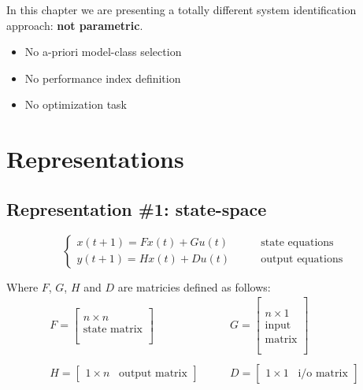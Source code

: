 In this chapter we are presenting a totally different system identification approach: \textbf{not parametric}.
\begin{itemize}
    \item No a-priori model-class selection
    \item No performance index definition
    \item No optimization task
\end{itemize}

\section{Representations}

\subsection{Representation \#1: state-space}

\[
\begin{cases}
    x(t+1) = F x(t) + G u(t) & \qquad \text{state equations} \\
    y(t+1) = H x(t) + D u(t) & \qquad \text{output equations}
\end{cases}
\]

Where $F$, $G$, $H$ and $D$ are matricies defined as follows:
\begin{align*}
    F = \begin{bmatrix}
        \\
        n \times n \\
        \text{state matrix} \\ \\
    \end{bmatrix}
    &
    \qquad
    G = \begin{bmatrix}
        \\
        \\
        n \times 1 \\
        \text{input} \\
        \text{matrix} \\ \\
    \end{bmatrix}
    \\ \\
    H = \begin{bmatrix}
        1 \times n \;\;\; \text{output matrix}
    \end{bmatrix}
    &
    \qquad
    D = \begin{bmatrix}
        1 \times 1 \;\;\; \text{i/o matrix}
    \end{bmatrix}
\end{align*}

